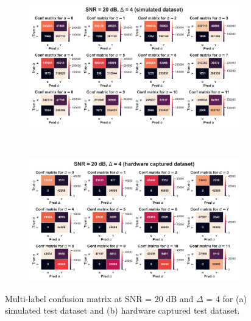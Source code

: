 \documentclass[journal]{IEEEtran}
\begin{document}
\begin{figure}[ht!]
    \captionsetup{justification=justified}
     \centering
     \begin{subfigure}[b]{0.48\textwidth}
         \centering
         \includegraphics[width=\textwidth]{Figures/Conf_mtx_multi_label_SNR_20_dB_Max_off_4_train_sim_test_sim.png}
         \caption{}
         \label{fig: cm_multilabel_snr_20_off_4_sim}
     \end{subfigure}
     \\
     \begin{subfigure}[b]{0.48\textwidth}
         \centering
         \includegraphics[width=\textwidth]{Figures/Conf_mtx_multi_label_SNR_20_dB_Max_off_4_train_sim_test_hw.png}
         \caption{}
         \label{fig: cm_multilabel_snr_20_off_4_hw}
     \end{subfigure}
        \caption{Multi-label confusion matrix at SNR = $20$ dB and $\Delta$ = $4$ for (a) simulated test dataset and (b) hardware captured test dataset.}
        \label{fig: cm_multilabel_snr_20_off_4}
\end{figure}
\end{document}
